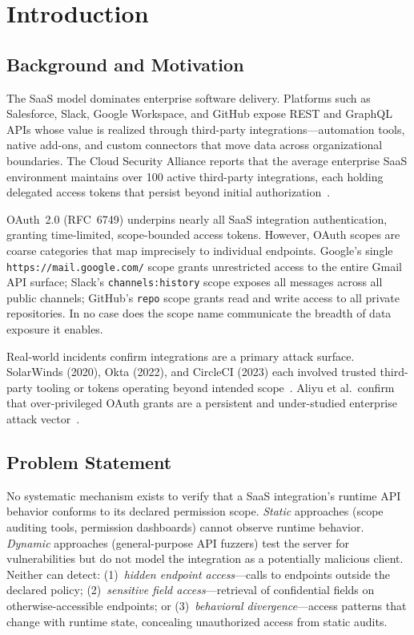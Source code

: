 \documentclass[conference]{IEEEtran}
\begin{document}
\section{Introduction}

\subsection{Background and Motivation}

The SaaS model dominates enterprise software delivery. Platforms such
as Salesforce, Slack, Google Workspace, and GitHub expose REST and
GraphQL APIs whose value is realized through third-party
integrations---automation tools, native add-ons, and custom connectors
that move data across organizational boundaries. The Cloud Security
Alliance reports that the average enterprise SaaS environment
maintains over 100 active third-party integrations, each holding
delegated access tokens that persist beyond initial
authorization~\cite{csa2023}.

OAuth~2.0 (RFC~6749) underpins nearly all SaaS integration
authentication, granting time-limited, scope-bounded access tokens.
However, OAuth scopes are coarse categories that map imprecisely to
individual endpoints. Google's single
\texttt{https://mail.google.com/} scope grants unrestricted access to
the entire Gmail API surface; Slack's \texttt{channels:history} scope
exposes all messages across all public channels; GitHub's \texttt{repo}
scope grants read and write access to all private repositories.
In no case does the scope name communicate the breadth of data exposure
it enables.

Real-world incidents confirm integrations are a primary attack surface.
SolarWinds (2020), Okta (2022), and CircleCI (2023) each involved
trusted third-party tooling or tokens operating beyond intended
scope~\cite{solarwinds2020,okta2022,circleci2023}. Aliyu et al.\
confirm that over-privileged OAuth grants are a persistent and
under-studied enterprise attack vector~\cite{aliyu2023}.

\subsection{Problem Statement}

No systematic mechanism exists to verify that a SaaS integration's
runtime API behavior conforms to its declared permission scope.
\emph{Static} approaches (scope auditing tools, permission dashboards)
cannot observe runtime behavior. \emph{Dynamic} approaches
(general-purpose API fuzzers) test the server for vulnerabilities but
do not model the integration as a potentially malicious client.
Neither can detect: (1)~\emph{hidden endpoint access}---calls to
endpoints outside the declared policy; (2)~\emph{sensitive field
access}---retrieval of confidential fields on otherwise-accessible
endpoints; or (3)~\emph{behavioral divergence}---access patterns that
change with runtime state, concealing unauthorized access from static
audits.
\end{document}
